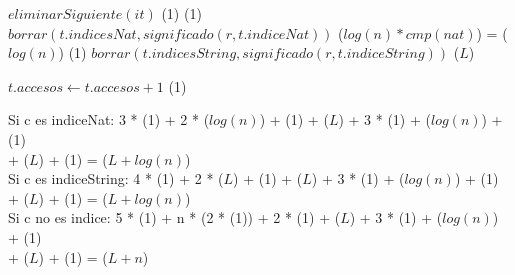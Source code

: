{        \State
        \State $eliminarSiguiente(it)$                              \comment \bigo(1)
                                               \comment \bigo(1)
            \State $borrar(t.indicesNat, significado(r, t.indiceNat))$          \comment \bigo($log(n) * cmp(nat)$) = \bigo($log(n)$)
        \EndIf
                                            \comment \bigo(1)
            \State $borrar(t.indicesString, significado(r, t.indiceString))$    \comment \bigo($L$)
        \EndIf

        \State
        \State $t.accesos \gets t.accesos + 1$                      \comment \bigo(1)
    \EndIf
}{Si c es indiceNat: 3 * \bigo(1) + 2 * \bigo($log(n)$) + \bigo(1) + \bigo($L$) + 3 * \bigo(1) + \bigo($log(n)$) + \bigo(1) \\
    \hspace*{16em} + \bigo($L$) + \bigo(1) = \bigo($L + log(n)$) \\
    \hspace*{8.25em} Si c es indiceString: 4 * \bigo(1) + 2 * \bigo($L$) + \bigo(1) + \bigo($L$) + 3 * \bigo(1) + \bigo($log(n)$) + \bigo(1) \\
    \hspace*{16em} + \bigo($L$) + \bigo(1) = \bigo($L + log(n)$) \\
    \hspace*{8.25em} Si c no es indice: 5 * \bigo(1) + n * (2 * \bigo(1)) + 2 * \bigo(1) + \bigo($L$) + 3 * \bigo(1) + \bigo($log(n)$) + \bigo(1) \\
    \hspace*{16em} + \bigo($L$) + \bigo(1) = \bigo($L + n$)
}

